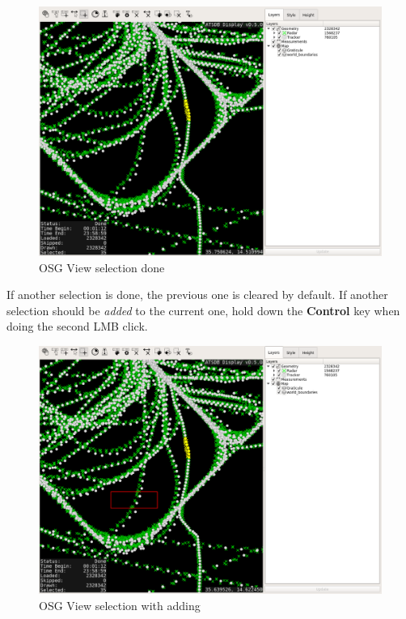 \begin{figure}[H]
    \hspace*{-2.5cm}
    \includegraphics[width=19cm,frame]{figures/osgview_select2.png}
  \caption{OSG View selection done}
\end{figure}

If another selection is done, the previous one is cleared by default. If another selection should be \textit{added} to the current one, hold down the \textbf{Control} key when doing the second LMB click.

\begin{figure}[H]
    \hspace*{-2.5cm}
    \includegraphics[width=19cm,frame]{figures/osgview_select_add1.png}
  \caption{OSG View selection with adding}
\end{figure}

